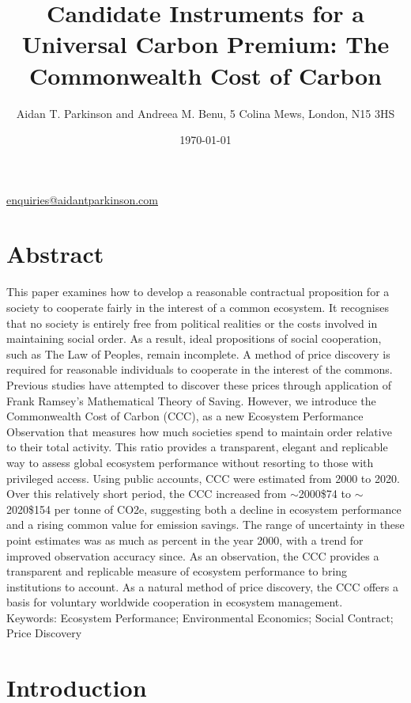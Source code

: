 \documentclass[10pt, oneside]{article}   	%
\title{Candidate Instruments for a Universal Carbon Premium: The Commonwealth Cost of Carbon}
\author{Aidan T. Parkinson and Andreea M. Benu, 5 Colina Mews, London, N15 3HS}
\date{\today}
\begin{document}
\maketitle
\begin{center}
\href{mailto:enquiries@aidantparkinson.com}{enquiries@aidantparkinson.com}
\end{center}

\section{Abstract}
This paper examines how to develop a reasonable contractual proposition for a society to cooperate fairly in the interest of a common ecosystem.
It recognises that no society is entirely free from political realities or the costs involved in maintaining social order.
As a result, ideal propositions of social cooperation, such as The Law of Peoples, remain incomplete.
A method of price discovery is required for reasonable individuals to cooperate in the interest of the commons.
Previous studies have attempted to discover these prices through application of Frank Ramsey's Mathematical Theory of Saving. 
However, we introduce the Commonwealth Cost of Carbon (CCC), as a new Ecosystem Performance Observation that measures how much societies spend to maintain order relative to their total activity.
This ratio provides a transparent, elegant and replicable way to assess global ecosystem performance without resorting to those with privileged access.
Using public accounts, CCC were estimated from 2000 to 2020.
Over this relatively short period, the CCC increased from $\sim$2000\$74 to $\sim$2020\$154 per tonne of CO2e, suggesting both a decline in ecosystem performance and a rising common value for emission savings.
The range of uncertainty in these point estimates was as much as  percent in the year 2000, with a trend for improved observation accuracy since.
As an observation, the CCC provides a transparent and replicable measure of ecosystem performance to bring institutions to account.
As a natural method of price discovery, the CCC offers a basis for voluntary worldwide cooperation in ecosystem management.\\

Keywords: Ecosystem Performance; Environmental Economics; Social Contract; Price Discovery\\

\section{Introduction}
\end{document}
